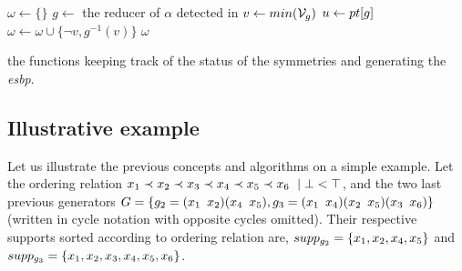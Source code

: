  \begin{algorithm}[!htbp]
 	
 	
 	
 	
 	
 	
 	{
 		$\omega \gets \{\}$\;
 		$g \gets$ the reducer of $\alpha$ detected in \isNotMinimal\;
 		$v \gets min(\mathcal{V}_g)$\;
 		$u \gets pt[g] $\;
 		$\omega \gets \omega \cup \{\neg v, g^{-1}(v)\}$\;
 		\Return $\omega$
 	}
 	\caption{the functions keeping track of the status of the symmetries and generating the \emph{esbp}.}
 	\label{algo:keep_status}
 	
 \end{algorithm}
 
 
 
 \subsection{Illustrative example}
  Let us illustrate the previous concepts and algorithms on a simple example. Let the ordering relation $x_1 \prec x_2 \prec x_3 \prec x_4
 \prec x_5 \prec x_6\ \mid \bot < \top$, and the two last previous generators
 $G = \{
 	g_2 = (x_1 \enskip x_2)(x_4 \enskip x_5),g_3 = (x_1 \enskip x_4)(x_2 \enskip x_5)(x_3 \enskip x_6)\}$
 (written in cycle notation with opposite cycles omitted). Their
 respective supports sorted according to ordering relation are, $supp_{g_{2}} = \{x_1, x_2, x_4, x_5\}$ and
 $supp_{g_3} = \{x_1, x_2, x_3, x_4, x_5, x_6\}$.
 
